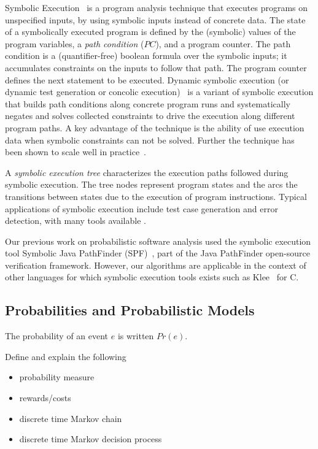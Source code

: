 Symbolic Execution~\cite{King1976,clarke76:system} is a program
analysis technique that executes programs on unspecified inputs, by
using symbolic inputs instead of concrete data. The state of a
symbolically executed program is defined by the (symbolic) values of
the program variables, a \emph{path condition} ($PC$), and a program
counter. The path condition is a (quantifier-free) boolean formula
over the symbolic inputs; it accumulates constraints on
the inputs to follow that path. The program counter defines the next
statement to be executed. Dynamic symbolic execution (or dynamic test generation or concolic execution)~\cite{godefroid05:dart,Cute,BitBlaze} is a variant of symbolic execution that builds path conditions along concrete program runs and systematically negates and solves collected constraints to drive the execution along different program paths. A key advantage of the technique is the ability of use execution data when symbolic constraints can not be solved. Further the technique has been shown to scale well in practice~\cite{SAGEsummaries}.

A \emph{symbolic execution tree} characterizes the execution paths
followed during symbolic execution. The tree nodes 
represent program states and the arcs the transitions between
states due to the execution of program instructions. Typical applications 
of symbolic execution include test case
generation and error detection, with many tools available
\cite{SPF,godefroid05:dart,tillman-halleux-tap2008,Klee}.

Our previous work on probabilistic software analysis used
the symbolic execution tool Symbolic Java PathFinder (SPF)~\cite{SPF}, 
part of the Java PathFinder open-source verification framework. 
However, our algorithms are applicable in the context
of other languages for which symbolic execution tools exists such as
Klee~\cite{Klee} for C. 




\subsection{Probabilities and Probabilistic Models}
The probability of an event $e$ is written $Pr(e)$.

Define and explain the following
\begin{itemize}
\item probability measure
\item rewards/costs
\item discrete time Markov chain
\item discrete time Markov decision process
\end{itemize}

